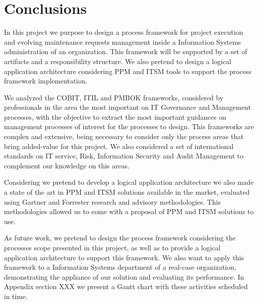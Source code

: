 
% 
% 

\section{Conclusions}

In this project we purpose to design a process framework for project execution and evolving maintenance requests management inside a Information Systems administration of an organization. This framework will be supported by a set of artifacts and a responsibility structure. We also pretend to design a logical application architecture considering PPM and ITSM tools to support the process framework implementation.\par
We analyzed the COBIT, ITIL and PMBOK frameworks, considered by professionals in the area the most important on IT Governance and Management processes, with the objective to extract the most important guidances on management processes of interest for the processes to design. This frameworks are complex and extensive, being necessary to consider only the process areas that bring added-value for this project. We also considered a set of international standards on IT service, Risk, Information Security and Audit Management to complement our knowledge on this areas.\par
Considering we pretend to develop a logical application architecture we also made a state of the art in PPM and ITSM solutions available in the market, evaluated using Gartner and Forrester research and advisory methodologies. This methodologies allowed us to come with a proposal of PPM and ITSM solutions to use.\par
As future work, we pretend to design the process framework considering the processes scope presented in this project, as well as to provide a logical application architecture to support this framework. We also want to apply this framework to a Information Systems department of a real-case organization, demonstrating the appliance of our solution and evaluating its performance. In Appendix section XXX we present a Gantt chart with these activities scheduled in time.\par 
